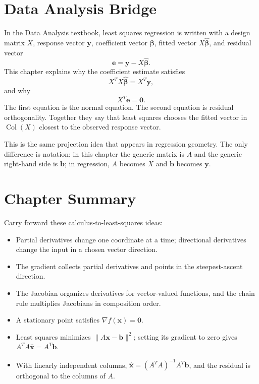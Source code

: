 \section{Data Analysis Bridge}
\label{mf:ch12-data-analysis-bridge}

In the Data Analysis textbook, least squares regression is written with a design matrix \(X\), response vector \(\mathbf{y}\), coefficient vector \(\boldsymbol{\beta}\), fitted vector \(X\widehat{\boldsymbol{\beta}}\), and residual vector
\[
    \mathbf{e}=\mathbf{y}-X\widehat{\boldsymbol{\beta}}.
\]
This chapter explains why the coefficient estimate satisfies
\[
    X^T X\widehat{\boldsymbol{\beta}}=X^T\mathbf{y},
\]
and why
\[
    X^T\mathbf{e}=\mathbf{0}.
\]
The first equation is the normal equation. The second equation is residual orthogonality. Together they say that least squares chooses the fitted vector in \(\operatorname{Col}(X)\) closest to the observed response vector.

This is the same projection idea that appears in regression geometry. The only difference is notation: in this chapter the generic matrix is \(A\) and the generic right-hand side is \(\mathbf{b}\); in regression, \(A\) becomes \(X\) and \(\mathbf{b}\) becomes \(\mathbf{y}\).

\section{Chapter Summary}
\label{mf:multivariable-gradient-least-squares-summary}

Carry forward these calculus-to-least-squares ideas:
\begin{itemize}
    \item Partial derivatives change one coordinate at a time; directional derivatives change the input in a chosen vector direction.
    \item The gradient collects partial derivatives and points in the steepest-ascent direction.
    \item The Jacobian organizes derivatives for vector-valued functions, and the chain rule multiplies Jacobians in composition order.
    \item A stationary point satisfies \(\nabla f(\mathbf{x})=\mathbf{0}\).
    \item Least squares minimizes \(\|A\mathbf{x}-\mathbf{b}\|^2\); setting its gradient to zero gives \(A^TA\widehat{\mathbf{x}}=A^T\mathbf{b}\).
    \item With linearly independent columns, \(\widehat{\mathbf{x}}=(A^TA)^{-1}A^T\mathbf{b}\), and the residual is orthogonal to the columns of \(A\).
\end{itemize}
